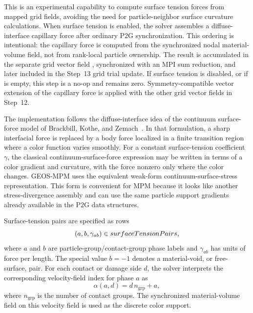 This is an experimental capability to compute surface tension forces from mapped grid fields, avoiding the need for particle-neighbor surface curvature calculations.  When surface tension is enabled, the solver assembles a diffuse-interface capillary force after ordinary P2G synchronization.  This ordering is intentional: the capillary force is computed from the synchronized nodal material-volume field, not from rank-local particle ownership.  The result is accumulated in the separate grid vector field , synchronized with an MPI sum reduction, and later included in the Step~13 grid trial update.  If surface tension is disabled, or if  is empty, this step is a no-op and  remains zero.  Symmetry-compatible vector extension of the capillary force is applied with the other grid vector fields in Step~12.

The implementation follows the diffuse-interface idea of the continuum surface-force model of Brackbill, Kothe, and Zemach~\cite{brackbill1992csf}.  In that formulation, a sharp interfacial force is replaced by a body force localized in a finite transition region where a color function varies smoothly.  For a constant surface-tension coefficient $\gamma$, the classical continuum-surface-force expression may be written in terms of a color gradient and curvature, with the force nonzero only where the color changes.  GEOS-MPM uses the equivalent weak-form continuum-surface-stress representation.  This form is convenient for MPM because it looks like another stress-divergence assembly and can use the same particle support gradients already available in the P2G data structures.

Surface-tension pairs are specified as rows
\begin{equation}
  \left(a,b,\gamma_{ab}\right) \in surfaceTensionPairs,
\end{equation}
where $a$ and $b$ are particle-group/contact-group phase labels and $\gamma_{ab}$ has units of force per length.  The special value $b=-1$ denotes a material-void, or free-surface, pair.  For each contact or damage side $d$, the solver interprets the corresponding velocity-field index for phase $a$ as
\begin{equation}
  \alpha(a,d)=d\,n_{\mathrm{grp}}+a,
\end{equation}
where $n_{\mathrm{grp}}$ is the number of contact groups.  The synchronized material-volume field on this velocity field is used as the discrete color support.

